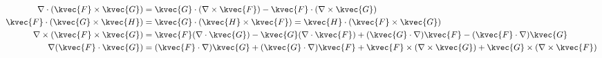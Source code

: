 \begin{align*}
\nabla \cdot (\kvec{F} \times \kvec{G})&=\kvec{G} \cdot (\nabla \times \kvec{F})-\kvec{F} \cdot (\nabla \times \kvec{G})\\
\kvec{F} \cdot (\kvec{G} \times \kvec{H})&=\kvec{G} \cdot (\kvec{H} \times \kvec{F})=\kvec{H} \cdot (\kvec{F} \times \kvec{G})\\
\nabla \times (\kvec{F} \times \kvec{G})&=\kvec{F} (\nabla \cdot \kvec{G})-\kvec{G} (\nabla \cdot \kvec{F})+(\kvec{G} \cdot \nabla)\kvec{F}-(\kvec{F} \cdot \nabla)\kvec{G}\\
\nabla (\kvec{F} \cdot \kvec{G})&=(\kvec{F} \cdot \nabla)\kvec{G}+(\kvec{G} \cdot \nabla)\kvec{F}+\kvec{F} \times (\nabla \times \kvec{G})+\kvec{G}\times (\nabla \times \kvec{F})
\end{align*}

